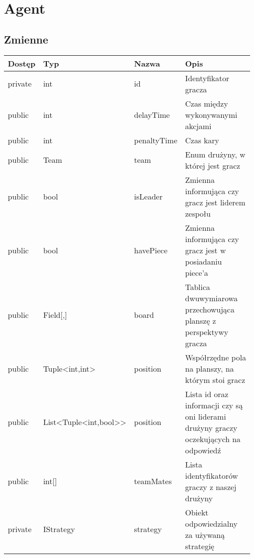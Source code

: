 \documentclass[11pt]{article}
\begin{document}
\section{Agent}
\subsection{Zmienne}
\begin{center}
    \begin{tabular}{ | l | l | l | p{5cm} |}
    \hline
    Dostęp & Typ & Nazwa & Opis \\ \hline
    private & int & id & Identyfikator gracza \\ \hline
    public & int & delayTime & Czas między wykonywanymi akcjami \\ \hline
    public & int & penaltyTime & Czas kary \\ \hline
    public & Team & team & Enum drużyny, w której jest gracz \\ \hline
    public & bool & isLeader & Zmienna informująca czy gracz jest liderem zespołu \\ \hline
    public & bool & havePiece & Zmienna informująca czy gracz jest w posiadaniu piece'a \\ \hline
    public & Field[,] & board & Tablica dwuwymiarowa przechowująca planszę z perspektywy gracza \\ \hline
    public & Tuple<int,int> & position & Współrzędne pola na planszy, na którym stoi gracz \\ \hline
    public & List<Tuple<int,bool>> & position & Lista id oraz 
    informacji czy są oni liderami drużyny graczy oczekujących na odpowiedź \\ \hline
    public & int[] & teamMates & Lista identyfikatorów graczy z naszej drużyny \\ \hline
    private & IStrategy & strategy & Obiekt odpowiedzialny za używaną strategię \\ \hline
    \end{tabular}
\end{center}
\end{document}
